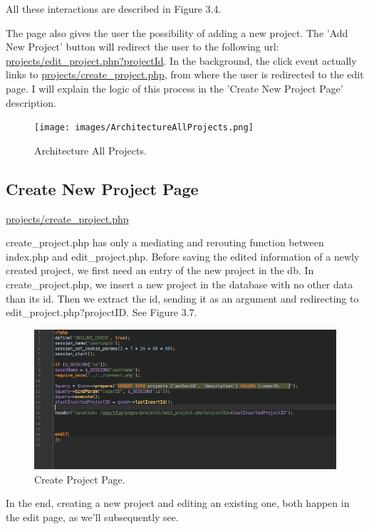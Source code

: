 All these interactions are described in Figure 3.4.

The page also gives the user the possibility of adding a new project. The 'Add New Project' button will redirect the user to the following url:
\url{projects/edit\_project.php?projectId}. In the background, the click event actually links to \url{projects/create\_project.php}, from where the user is redirected to the edit page. I will explain the logic of this process in the 'Create New Project Page' description.

\begin{figure}
\texttt{[image: images/ArchitectureAllProjects.png]}
\caption{Architecture All Projects.}
\label{fig:architecture_all_projects.}
\end{figure}

\subsection{Create New Project Page}
\url{projects/create\_project.php}

create\_project.php has only a mediating and rerouting function between index.php and edit\_project.php. Before saving the edited information of a newly created project, we first need an entry of the new project in the db. 
In create\_project.php, we insert a new project in the database with no other data than its id. Then we extract the id, sending it as an argument and redirecting to edit\_project.php?{projectID}. See Figure 3.7.

\begin{figure}
\includegraphics[width=1\linewidth]{images/CreateProjectPage.png}
\caption{Create Project Page.}
\label{fig:create_project.}
\end{figure}


In the end, creating a new project and editing an existing one, both happen in the edit page, as we'll subsequently see.

